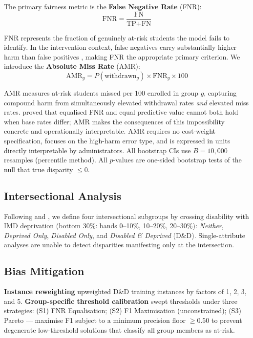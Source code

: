 \documentclass[12pt,a4paper]{article}
\begin{document}
The primary fairness metric is the \textbf{False Negative Rate} (FNR):
\begin{equation}
  \text{FNR} = \frac{\text{FN}}{\text{TP} + \text{FN}}
\end{equation}

FNR represents the fraction of genuinely at-risk students the model fails to
identify. In the intervention context, false negatives carry substantially
higher harm than false positives \citep{verma2018}, making FNR the appropriate
primary criterion. We introduce the \textbf{Absolute Miss Rate} (AMR):
\begin{equation}
  \text{AMR}_g = P(\text{withdrawn}_g) \times \text{FNR}_g \times 100
  \label{eq:amr}
\end{equation}

AMR measures at-risk students missed per 100 enrolled in group $g$, capturing
compound harm from simultaneously elevated withdrawal rates \textit{and}
elevated miss rates. \citet{chouldechova2017} proved that equalised FNR and
equal predictive value cannot both hold when base rates differ; AMR makes the
consequences of this impossibility concrete and operationally interpretable.
AMR requires no cost-weight specification, focuses on the high-harm error
type, and is expressed in units directly interpretable by administrators.
All bootstrap CIs use $B = 10{,}000$ resamples (percentile method). All
$p$-values are one-sided bootstrap tests of the null that true disparity
$\leq 0$.

\subsection{Intersectional Analysis}
\label{sec:intersect}

Following \citet{buolamwini2018} and \citet{crenshaw1989}, we define four
intersectional subgroups by crossing disability with IMD deprivation (bottom
30\%: bands 0--10\%, 10--20\%, 20--30\%): \textit{Neither},
\textit{Deprived Only}, \textit{Disabled Only}, and
\textit{Disabled \& Deprived} (D\&D). Single-attribute analyses are unable
to detect disparities manifesting only at the intersection.

\subsection{Bias Mitigation}
\label{sec:mitigation}

\textbf{Instance reweighting} upweighted D\&D training instances by factors
of 1, 2, 3, and 5. \textbf{Group-specific threshold calibration} swept
thresholds under three strategies: (S1) FNR Equalisation; (S2) F1
Maximisation (unconstrained); (S3) Pareto --- maximise F1 subject to a
minimum precision floor $\geq 0.50$ to prevent degenerate low-threshold
solutions that classify all group members as at-risk.
\end{document}
